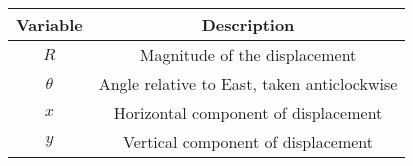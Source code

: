\begin{tabular}[12pt]{ |c| c|}
    \hline
    \textbf{Variable} & \textbf{Description}\\ 
    \hline
    $R$ & Magnitude of the displacement \\
    \hline 
    $\theta$ & Angle relative to East, taken anticlockwise\\
    \hline
    $x$ & Horizontal component of displacement\\
    \hline
    $y$ & Vertical component of displacement\\
    \hline   
    \end{tabular}